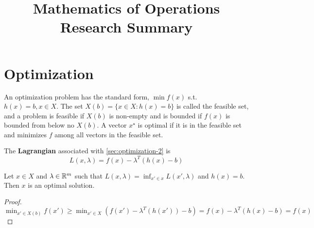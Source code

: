 

\title{Mathematics of Operations Research Summary}



\maketitle

\section{Optimization}
\label{sec:optimization}

\begin{defn}
  \label{sec:optimization-2}
  An optimization problem has the standard form, $\min f(x)$ s.t.
  $h(x) = b, x \in X$.  The set $X(b) = \{ x \in X : h(x) = b \} $ is
  called the feasible set, and a problem is feasible if $X(b)$ is
  non-empty and is bounded if $f(x)$ is bounded from below no $X(b)$.
  A vector $ x^{\star}$ is optimal if it is in the feasible set and
  minimizes $f$ among all vectors in the feasible set.
\end{defn}

\begin{defn}
  \label{sec:optimization-3}
  The \textbf{Lagrangian} associated with \ref{sec:optimization-2} is
  \begin{equation}
    \label{eq:1}
    L(x, \lambda) = f(x) - \lambda^{T} (h(x) - b)
  \end{equation}
\end{defn}

\begin{thm}
  \label{sec:optimization-1}
  Let $x \in X$ and $\lambda \in \mathbb{R}^{m}$ such that $L(x, \lambda) =
  \inf_{x' \in x} L(x', \lambda)$ and $h(x) = b$.  Then $x$ is an
  optimal solution.
\end{thm}


\begin{proof}
  $\min_{x' \in X(b)} f(x') \geq \min_{x' \in X} (f(x') -
  \lambda^{T}(h(x')) - b) = f(x) - \lambda^{T}(h(x) - b) = f(x)$
\end{proof}

